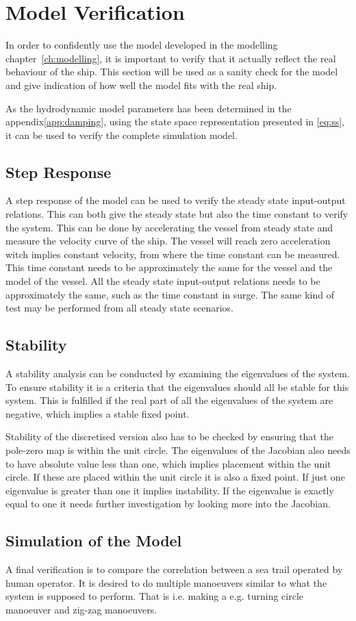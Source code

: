 \section{Model Verification}
\label{sec:model_verification}
In order to confidently use the model developed in the modelling chapter~\vref{ch:modelling}, it is important to verify that it actually reflect the real behaviour of the ship. This section will be used as a sanity check for the model and give indication of how well the model fits with the real ship.

As the hydrodynamic model parameters has been determined in the appendix\vref{app:damping}, using the state space representation presented in \vref{eq:ss}, it can be used to verify the complete simulation model.

\subsection{Step Response}
A step response of the model can be used to verify the steady state input-output relations. This can both give the steady state but also the time constant to verify the system. This can be done by accelerating the vessel from steady state and measure the velocity curve of the ship. The vessel will reach zero acceleration witch implies constant velocity, from where the time constant can be measured. This time constant needs to be approximately the same for the vessel and the model of the vessel. All the steady state input-output relations needs to be approximately the same, such as the time constant in surge. The same kind of test may be performed from all steady state scenarios.

\subsection{Stability}
A stability analysis can be conducted by examining the eigenvalues of the system. To ensure stability it is a criteria that the eigenvalues should all be stable for this system. This is fulfilled if the real part of all the eigenvalues of the system are negative, which implies a stable fixed point.

Stability of the discretised version also has to be checked by ensuring that the pole-zero map is within the unit circle. The eigenvalues of the Jacobian also needs to have absolute value less than one, which implies placement within the unit circle. If these are placed within the unit circle it is also a fixed point. If just one eigenvalue is greater than one it implies instability. If the eigenvalue is exactly equal to one it needs further investigation by looking more into the Jacobian.

\subsection{Simulation of the Model}
A final verification is to compare the correlation between a sea trail operated by human operator. It is desired to do multiple manoeuvers similar to what the system is supposed to perform. That is i.e. making a e.g. turning circle manoeuver and zig-zag manoeuvers.
